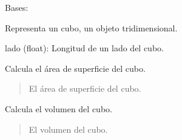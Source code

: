 \documentclass[letterpaper,10pt,spanish]{sphinxmanual}
\begin{document}

\begin{fulllineitems}
\label{\detokenize{pr8:pr8.3.Cubo}}
\pysigstartsignatures
{}
\pysigstopsignatures
\sphinxAtStartPar
Bases: {\hyperref[\detokenize{pr8:pr8.3.Objeto3D}]{}}

\sphinxAtStartPar
Representa un cubo, un objeto tridimensional.
\begin{description}
\sphinxAtStartPar
lado (float): Longitud de un lado del cubo.

\end{description}

\begin{fulllineitems}
\label{\detokenize{pr8:pr8.3.Cubo.area_superficie}}
\pysigstartsignatures
{}
\pysigstopsignatures
\sphinxAtStartPar
Calcula el área de superficie del cubo.
\begin{quote}\begin{description}
\sphinxAtStartPar
El área de superficie del cubo.

\end{description}\end{quote}

\end{fulllineitems}


\begin{fulllineitems}
\label{\detokenize{pr8:pr8.3.Cubo.volumen}}
\pysigstartsignatures
{}
\pysigstopsignatures
\sphinxAtStartPar
Calcula el volumen del cubo.
\begin{quote}\begin{description}
\sphinxAtStartPar
El volumen del cubo.

\end{description}\end{quote}

\end{fulllineitems}


\end{fulllineitems}
\end{document}
